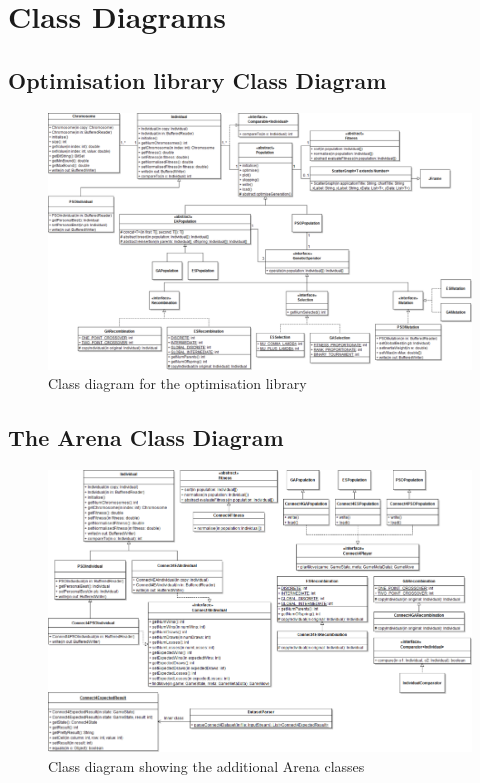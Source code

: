 \chapter{Class Diagrams}

\section{Optimisation library Class Diagram}
\label{sec:appendix1}
\begin{landscape}
  \begin{figure}[h]
    \begin{center}
      \includegraphics{Figures/generic_class_diagram}
    \end{center}
    \caption{Class diagram for the optimisation library}
    \label{fig:phase1}
  \end{figure}
\end{landscape}

\section{The Arena Class Diagram}
\label{sec:appendix2}
\begin{landscape}
  \begin{figure}[h]
    \begin{center}
      \includegraphics{Figures/connect_4_class_diagram}
    \end{center}
    \caption{Class diagram showing the additional Arena classes}
    \label{fig:phase2}
  \end{figure}
\end{landscape}

